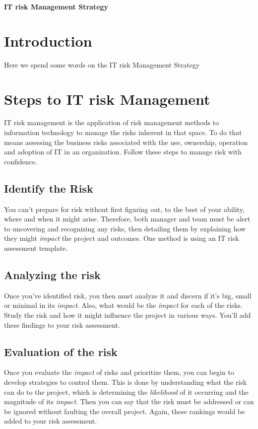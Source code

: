 \documentclass[a4paper,12pt]{article}
\begin{document}
\textbf{IT risk Management Strategy}

\tableofcontents
\clearpage
 
\section{Introduction}
Here we spend some words on the IT risk Management Strategy

\section{Steps to IT risk Management}

IT risk management is the application of risk management methods to information technology to manage the risks inherent in that space. To do that means assessing the business risks associated with the use, ownership, operation and adoption of IT in an organization. Follow these steps to manage risk with confidence.

\subsection{Identify the Risk}
You can’t prepare for risk without first figuring out, to the best of your ability, where and when it might arise. Therefore, both manager and team must be alert to uncovering and recognizing any risks, then detailing them by explaining how they might \emph{impact} the project and outcomes. One method is using an IT risk assessment template.

\subsection{Analyzing the risk}
Once you’ve identified risk, you then must analyze it and discern if it’s big, small or minimal in its \emph{impact}. Also, what would be the \emph{impact} for each of the risks. Study the risk and how it might influence the project in various ways. You’ll add these findings to your risk assessment.

\subsection{Evaluation of the risk}
Once you evaluate the \emph{impact} of risks and prioritize them, you can begin to develop strategies to control them. This is done by understanding what the risk can do to the project, which is determining the \emph{likelihood} of it occurring and the magnitude of its \emph{impact}. Then you can say that the risk must be addressed or can be ignored without faulting the overall project. Again, these rankings would be added to your risk assessment.
\end{document}
